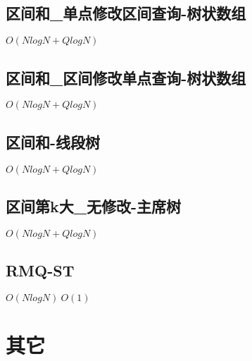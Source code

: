 \documentclass[10pt]{article}
\begin{document}
\subsection{区间和\_单点修改区间查询-树状数组}
$O(NlogN+QlogN)$


\subsection{区间和\_区间修改单点查询-树状数组}
$O(NlogN+QlogN)$


\subsection{区间和-线段树}
$O(NlogN+QlogN)$


\subsection{区间第k大\_无修改-主席树}
$O(NlogN+QlogN)$


\subsection{RMQ-ST}
$O(NlogN)~O(1)$

\section{其它}
\end{document}
